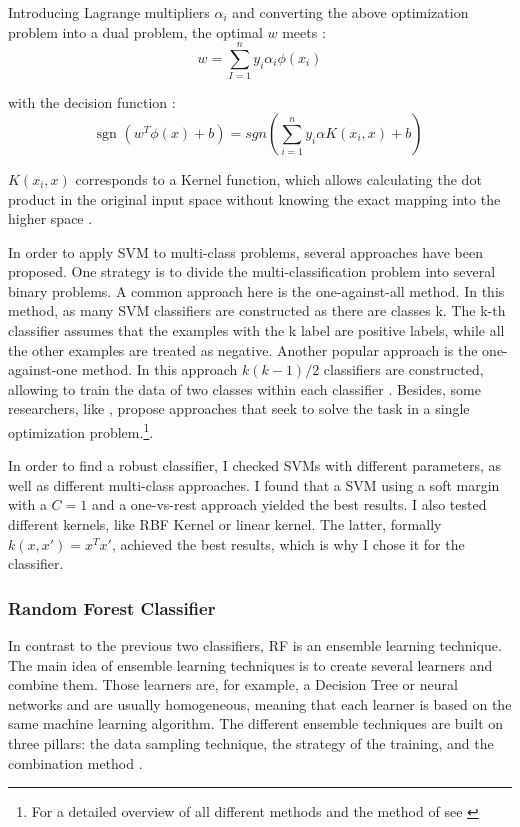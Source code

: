 \documentclass[12pt, a4paper, titlepage]{article}
\begin{document}
Introducing Lagrange multipliers $\alpha_i$ and converting the above optimization problem into a dual problem, the optimal $w$ meets \citep{Chang2001, Jordan2006}:
\[w = \sum_{I=1}^n y_i\alpha_i\phi(x_i)\]

with the decision function \citep{Chang2001}:
\[\text{sgn } (w^T\phi(x)+b) = sgn(\sum_{i=1}^n y_i \alpha K(x_i, x) +b)\]

$K(x_i, x)$ corresponds to a Kernel function, which allows calculating the dot product in the original input space without knowing the exact mapping into the higher space \citep{Han2012, Jordan2006}. 

In order to apply \ac{SVM} to multi-class problems, several approaches have been proposed. One strategy is to divide the multi-classification problem into several binary problems. A common approach here is the one-against-all method. In this method, as many \ac{SVM} classifiers are constructed as there are classes k. The k-th classifier assumes that the examples with the k label are positive labels, while all the other examples are treated as negative. Another popular approach is the one-against-one method. In this approach $k(k-1)/2$ classifiers are constructed, allowing to train the data of two classes within each classifier \citep{Hsu2002}. Besides, some researchers, like \citet{Crammer2001}, propose approaches that seek to solve the task in a single optimization problem.\footnote{For a detailed overview of all different methods and the method of \citet{Crammer2001} see \citet{Hsu2002,Crammer2001}}. 

In order to find a robust classifier, I checked \ac{SVM}s with different parameters, as well as different multi-class approaches. I found that a \ac{SVM} using a soft margin with a $C=1$ and a one-vs-rest approach yielded the best results. I also tested different kernels, like  RBF Kernel or linear kernel. The latter, formally  $k(x, x') = x^Tx'$, achieved the best results, which is why I chose it for the classifier. 

\subsubsection{Random Forest Classifier}
In contrast to the previous two classifiers, \ac{RF} is an ensemble learning technique. The main idea of ensemble learning techniques is to create several learners and combine them. Those learners are, for example, a Decision Tree or neural networks and are usually homogeneous, meaning that each learner is based on the same machine learning algorithm. The different ensemble techniques are built on three pillars: the data sampling technique, the strategy of the training, and the combination method \citep{polikar2012, zhou2009}. 
\end{document}
